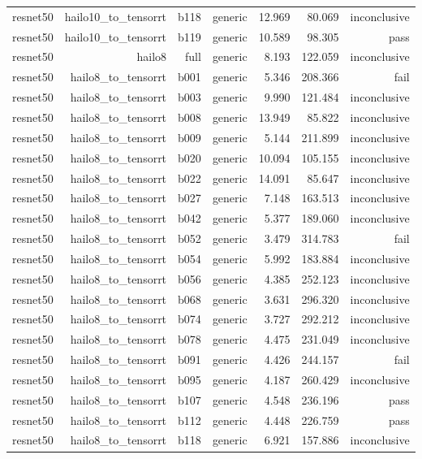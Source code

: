 \begin{table}[t]
\begin{tabular}{lrrrrrr}
resnet50 & hailo10\_to\_tensorrt & b118 & generic & 12.969 & 80.069 & inconclusive \\
resnet50 & hailo10\_to\_tensorrt & b119 & generic & 10.589 & 98.305 & pass \\
resnet50 & hailo8 & full & generic & 8.193 & 122.059 & inconclusive \\
resnet50 & hailo8\_to\_tensorrt & b001 & generic & 5.346 & 208.366 & fail \\
resnet50 & hailo8\_to\_tensorrt & b003 & generic & 9.990 & 121.484 & inconclusive \\
resnet50 & hailo8\_to\_tensorrt & b008 & generic & 13.949 & 85.822 & inconclusive \\
resnet50 & hailo8\_to\_tensorrt & b009 & generic & 5.144 & 211.899 & inconclusive \\
resnet50 & hailo8\_to\_tensorrt & b020 & generic & 10.094 & 105.155 & inconclusive \\
resnet50 & hailo8\_to\_tensorrt & b022 & generic & 14.091 & 85.647 & inconclusive \\
resnet50 & hailo8\_to\_tensorrt & b027 & generic & 7.148 & 163.513 & inconclusive \\
resnet50 & hailo8\_to\_tensorrt & b042 & generic & 5.377 & 189.060 & inconclusive \\
resnet50 & hailo8\_to\_tensorrt & b052 & generic & 3.479 & 314.783 & fail \\
resnet50 & hailo8\_to\_tensorrt & b054 & generic & 5.992 & 183.884 & inconclusive \\
resnet50 & hailo8\_to\_tensorrt & b056 & generic & 4.385 & 252.123 & inconclusive \\
resnet50 & hailo8\_to\_tensorrt & b068 & generic & 3.631 & 296.320 & inconclusive \\
resnet50 & hailo8\_to\_tensorrt & b074 & generic & 3.727 & 292.212 & inconclusive \\
resnet50 & hailo8\_to\_tensorrt & b078 & generic & 4.475 & 231.049 & inconclusive \\
resnet50 & hailo8\_to\_tensorrt & b091 & generic & 4.426 & 244.157 & fail \\
resnet50 & hailo8\_to\_tensorrt & b095 & generic & 4.187 & 260.429 & inconclusive \\
resnet50 & hailo8\_to\_tensorrt & b107 & generic & 4.548 & 236.196 & pass \\
resnet50 & hailo8\_to\_tensorrt & b112 & generic & 4.448 & 226.759 & pass \\
resnet50 & hailo8\_to\_tensorrt & b118 & generic & 6.921 & 157.886 & inconclusive \\

\end{tabular}
\end{table}
